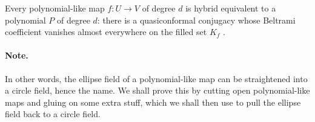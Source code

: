 \documentclass[11pt,a4paper]{article}
\begin{document}
\setcounter{theorem}{51}\begin{theorem}
\label{thm:cd13-straightening}
Every polynomial-like map $f\colon U\to V$ of degree $d$ is
hybrid equivalent to a polynomial $P$ of degree $d$: there is a quasiconformal conjugacy whose Beltrami coefficient vanishes almost everywhere on the filled set $K_f$ \cite{douadyhubbard1985polynomiallike}.
\end{theorem}
\paragraph{Note.}
In other words, the ellipse field of a polynomial-like map can be
straightened into a circle field, hence the name.
We shall prove this by cutting open polynomial-like maps and gluing on
some extra stuff, which we shall then use to pull the ellipse field
back to a circle field.
\end{document}
